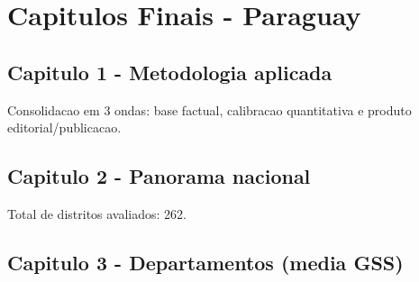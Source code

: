 \section{Capitulos Finais - Paraguay}\label{capitulos-finais---paraguay}

\subsection{Capitulo 1 - Metodologia
aplicada}\label{capitulo-1---metodologia-aplicada}

Consolidacao em 3 ondas: base factual, calibracao quantitativa e produto
editorial/\allowbreak \allowbreak publicacao.

\subsection{Capitulo 2 - Panorama
nacional}\label{capitulo-2---panorama-nacional}

Total de distritos avaliados: 262.

\subsection{Capitulo 3 - Departamentos (media
GSS)}\label{capitulo-3---departamentos-media-gss}

